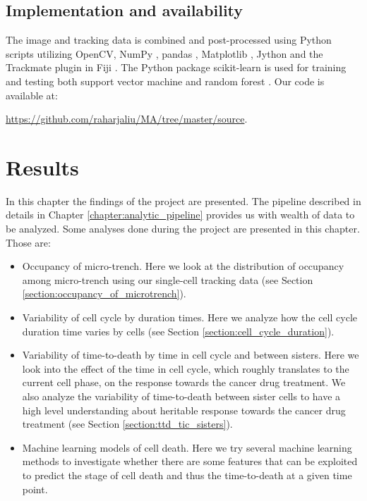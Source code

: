 \documentclass[pdftex,12pt,a4paper]{report}
\begin{document}
\section{Implementation and availability}

The image and tracking data is combined and post-processed using Python scripts utilizing OpenCV\cite{bradski2008learning}, NumPy \cite{walt2011numpy}, pandas \cite{mckinney2010data}, Matplotlib \cite{hunter2007matplotlib}, Jython and the Trackmate \cite{tinevez2017trackmate, pedroni2002jython} plugin in Fiji \cite{schindelin2012fiji}. The Python package scikit-learn is used for training and testing both support vector machine and random forest \cite{scikit-learn}. Our code is available at:

\href{https://github.com/raharjaliu/MA/tree/master/source}{https://github.com/raharjaliu/MA/tree/master/source}.

\chapter{Results}

In this chapter the findings of the project are presented. The pipeline described in details in Chapter \ref{chapter:analytic_pipeline} provides us with wealth of data to be analyzed. Some analyses done during the project are presented in this chapter. Those are:

\begin{itemize}
\item Occupancy of micro-trench. Here we look at the distribution of occupancy among micro-trench using our single-cell tracking data (see Section \ref{section:occupancy_of_microtrench}).
\item Variability of cell cycle by duration times. Here we analyze how the cell cycle duration time varies by cells (see Section \ref{section:cell_cycle_duration}).
\item Variability of time-to-death by time in cell cycle and between sisters.  Here we look into the effect of the time in cell cycle, which roughly translates to the current cell phase, on the response towards the cancer drug treatment. We also analyze the variability of time-to-death between sister cells to have a high level understanding about heritable response towards the cancer drug treatment  (see Section \ref{section:ttd_tic_sisters}).
\item Machine learning models of cell death. Here we try several machine learning methods to investigate whether there are some features that can be exploited to predict the stage of cell death and thus the time-to-death at a given time point.
\end{itemize}
\end{document}
